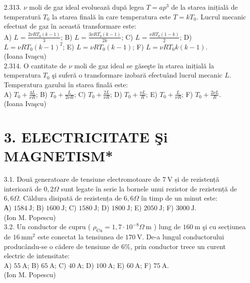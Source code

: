 \documentclass[10pt]{article}
\begin{document}
2.313. $\nu$ moli de gaz ideal evoluează după legea $T=a p^{3}$ de la starea inițială de temperatură $T_{0}$ la starea finală în care temperatura este $T=k T_{0}$. Lucrul mecanic efectuat de gaz în această transformare este:\\ A) $L=\frac{2 \nu R T_{0}(k-1)}{3}$; B) $L=\frac{3 \nu R T_{0}^{\prime}(k-1)}{2 k}$; C) $L=\frac{\nu R T_{0}(1-k)}{2}$; D) $L=\nu R T_{0}(k-1)^{2}$; E) $L=\nu R T_{0}(k-1)$; F) $L=\nu R T_{0} k(k-1)$.\\ (Ioana Ivaşcu)\\

2.314. O cantitate de $\nu$ moli de gaz ideal se găseşte în starea inițială la temperatura $T_{0}$ şi suferă o transformare izobară efectuând lucrul mecanic $L$. Temperatura gazului în starea finală este:\\ A) $T_{0}+\frac{4 L}{\nu R}$; B) $T_{0}+\frac{L}{2 \nu R}$; C) $T_{0}+\frac{2 L}{\nu R}$; D) $T_{0}+\frac{\nu L}{R}$; E) $T_{0}+\frac{L}{\nu R}$; F) $T_{0}+\frac{2 \nu L}{R}$.\\ (Ioana Ivaşcu)\\

\section*{3. ELECTRICITATE Şi MAGNETISM*}


3.1. Două generatoare de tensiune electromotoare de $7 \mathrm{~V}$ și de rezistență interioară de $0,2 \Omega$ sunt legate în serie la bornele unui rezistor de rezistență de $6,6 \Omega$. Căldura disipată de rezistența de $6,6 \Omega$ în timp de un minut este:\\ А) $1584 \mathrm{~J}$; B) $1600 \mathrm{~J}$; C) $1580 \mathrm{~J}$; D) $1800 \mathrm{~J}$; E) $2050 \mathrm{~J}$; F) $3000 \mathrm{~J}$.\\ (Ion M. Popescu)\\

3.2. Un conductor de cupru ( $\rho_{\mathrm{Cu}}=1,7 \cdot 10^{-8} \Omega \mathrm{~m}$ ) lung de $160 \mathrm{~m}$ şi cu secțiunea de $16 \mathrm{~mm}^{2}$ este conectat la tensiunea de $170 \mathrm{~V}$. De-a lungul conductorului producându-se o cădere de tensiune de $6 \%$, prin conductor trece un curent electric de intensitate:\\ A) $55 \mathrm{~A}$; B) $65 \mathrm{~A}$; C) $40 \mathrm{~A}$; D) $100 \mathrm{~A}$; E) $60 \mathrm{~A}$; F) $75 \mathrm{~A}$.\\ (Ion M. Popescu)\\
\end{document}
